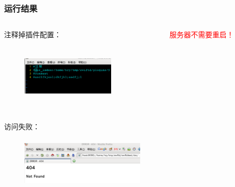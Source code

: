 \documentclass[10pt,dvipdfm]{beamer}
\begin{document}
\begin{frame}
	\frametitle{运行结果}
	\begin{columns}
		\begin{column}{0.6\textwidth}
			注释掉插件配置：
			\begin{figure}[htbp]
			\centering
			\includegraphics[height=3cm, width=4.5cm]{pics/complugin.eps}
			\end{figure}
		\end{column}
		
		\begin{column}{0.3\textwidth}
			\textcolor{red}{服务器不需要重启！}
		\end{column}
	\end{columns}
	
	访问失败：
	\begin{figure}[htbp]
	\centering
	\includegraphics[height=2.5cm, width=6cm]{pics/nodirindex.eps}
	\end{figure}
\end{frame}
\end{document}
